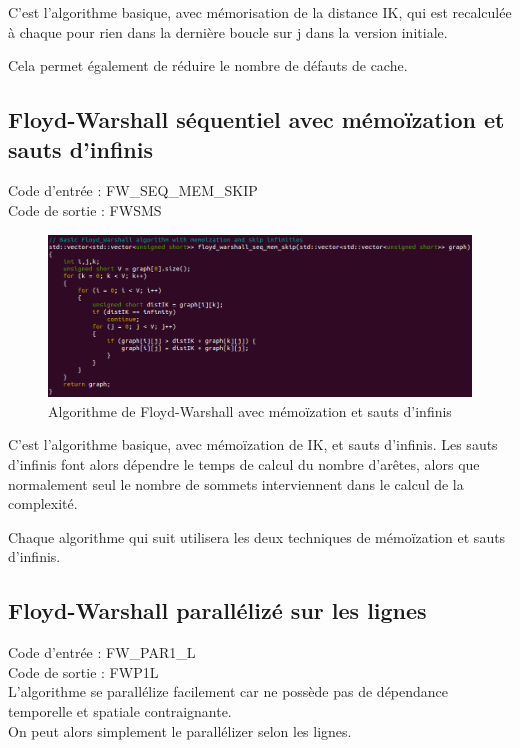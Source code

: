 \documentclass[a4paper,11pt]{article}
\begin{document}
C'est l'algorithme basique, avec mémorisation de la distance IK, qui est recalculée à chaque pour rien dans la dernière boucle sur j dans la version initiale.

Cela permet également de réduire le nombre de défauts de cache.

\subsection{Floyd-Warshall séquentiel avec mémoïzation et sauts d'infinis}

\noindent Code d'entrée : FW\_SEQ\_MEM\_SKIP \\
Code de sortie : FWSMS

\begin{figure}[H]
\begin{center}
  \includegraphics[scale=0.6]{FW_SEQ_MEM_SKIP.png}
  \caption{Algorithme de Floyd-Warshall avec mémoïzation et sauts d'infinis}
\end{center}
\end{figure}

C'est l'algorithme basique, avec mémoïzation de IK, et sauts d'infinis. Les sauts d'infinis font alors dépendre le temps de calcul du nombre d'arêtes, alors que normalement seul le nombre de sommets interviennent dans le calcul de la complexité.

Chaque algorithme qui suit utilisera les deux techniques de mémoïzation et sauts d'infinis.

\subsection{Floyd-Warshall parallélizé sur les lignes}

\noindent Code d'entrée : FW\_PAR1\_L \\
Code de sortie : FWP1L\\

L'algorithme se parallélize facilement car ne possède pas de dépendance temporelle et spatiale contraignante.\\
On peut alors simplement le parallélizer selon les lignes.\\
\end{document}
